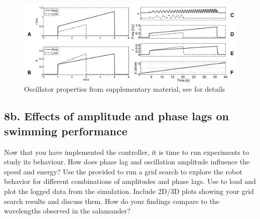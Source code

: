 \documentclass{cmc}
\begin{document}
\begin{figure}[H]
  \centering
  \includegraphics[width=1.0\textwidth]{figures/science_oscillator_properties}
  \caption{Oscillator properties from \cite{ijspeert2007swimming} supplementary
    material, see \cite{ijspeert2007swimming} for details}
  \label{fig:science_oscillator_properties}
\end{figure}


\subsection*{8b. Effects of amplitude and phase lags on swimming
  performance}
\label{sec:amplitude-phase-performance}

Now that you have implemented the controller, it is time to run experiments to
study its behaviour. How does phase lag and oscillation amplitude influence the
speed and energy? Use the provided  to run a grid search
to explore the robot behavior for different combinations of amplitudes and phase
lags. Use  to load and plot the logged data from the
simulation. Include 2D/3D plots showing your grid search results and discuss
them. How do your findings compare to the wavelengths observed in the
salamander?

\end{document}
